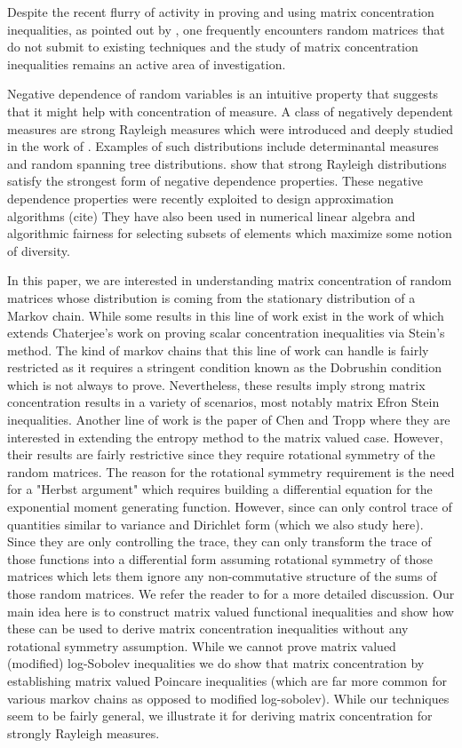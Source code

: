 Despite the recent flurry of activity in proving and using matrix concentration inequalities, as pointed out by \cite{CT13}, one frequently encounters random matrices that do not submit to existing techniques and the study of matrix concentration inequalities remains an active area of investigation.

Negative dependence of random variables is an intuitive property that suggests that it might help with concentration of measure. A class of negatively dependent measures are strong Rayleigh measures which were introduced and deeply studied in the work of \cite{BBL09}. Examples of such distributions include determinantal measures and random spanning tree distributions. \cite{BBL09} show that strong Rayleigh distributions satisfy the strongest form of negative dependence properties. These negative dependence properties were recently exploited
to design approximation algorithms  (cite) They have also been used in numerical linear algebra and algorithmic fairness for selecting subsets of elements which maximize some notion of diversity.

In this paper, we are interested in understanding matrix concentration of random matrices whose distribution is coming from the stationary distribution of a Markov chain. While some results in this line of work exist in the work of \cite{PMT,MJCFT} which extends Chaterjee's work \cite{Chaterjee} on proving scalar concentration inequalities via Stein's method. The kind of markov chains that this line of work can handle is fairly restricted as it requires a stringent condition known as the Dobrushin condition which is not always to prove. Nevertheless, these results imply strong matrix concentration results in a variety of scenarios, most notably matrix Efron Stein inequalities. Another line of work is the paper of Chen and Tropp \cite{CT13} where they are  interested in extending the entropy method to the matrix valued case. However, their results are fairly restrictive since they require rotational symmetry of the random matrices. The reason for the rotational symmetry requirement is the need for a "Herbst argument" which requires building a differential equation for the exponential moment generating function. However, since \cite{CT13} can only control trace of quantities similar to variance and Dirichlet form (which we also study here). Since they are only controlling the trace, they can only transform the trace of those functions into a differential form assuming rotational symmetry of those matrices which lets them ignore any non-commutative structure of the sums of those random matrices. We refer the reader to \cite{CT13} for a more detailed discussion. Our main idea here is to construct matrix valued functional inequalities and show how these can be used to derive matrix concentration inequalities without any rotational symmetry assumption. While we cannot prove matrix valued (modified) log-Sobolev inequalities we do show that matrix concentration by establishing matrix valued Poincare inequalities (which are far more common for various markov chains as opposed to modified log-sobolev). While our techniques seem to be fairly general, we illustrate it for deriving matrix concentration for strongly Rayleigh measures.

